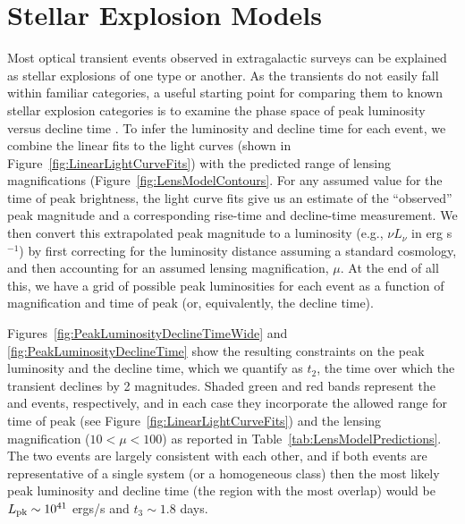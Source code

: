 \section{Stellar Explosion Models}
\label{sec:Classification}

Most optical transient events observed in extragalactic surveys can be
explained as stellar explosions of one type or another.  As the \spock
transients do not easily fall within familiar categories, a useful
starting point for comparing them to known stellar explosion
categories is to examine the phase space of peak luminosity versus
decline time \citep[see, e.g.,][]{Kasliwal:2010}.  To infer the
luminosity and decline time for each \spock event, we combine the
linear fits to the light curves (shown in
Figure~\ref{fig:LinearLightCurveFits}) with the predicted range of
lensing magnifications (Figure~\ref{fig:LensModelContours}. For any
assumed value for the time of peak brightness, the light curve fits
give us an estimate of the ``observed'' peak magnitude and a
corresponding rise-time and decline-time measurement.  We then convert
this extrapolated peak magnitude to a luminosity (e.g., $\nu L_\nu$ in
erg s$^{-1}$) by first correcting for the luminosity distance assuming
a standard \LCDM cosmology, and then accounting for an assumed lensing
magnification, $\mu$.  At the end of all this, we have a grid of
possible peak luminosities for each event as a function of
magnification and time of peak (or, equivalently, the decline time).

Figures~\ref{fig:PeakLuminosityDeclineTimeWide} and
\ref{fig:PeakLuminosityDeclineTime} show the resulting
constraints on the peak luminosity and the decline time, which we
quantify as $t_2$, the time over which the transient declines by 2
magnitudes.  Shaded green and red bands represent the \spockone and
\spocktwo events, respectively, and in each case they incorporate the
allowed range for time of peak (see
Figure~\ref{fig:LinearLightCurveFits}) and the lensing magnification
($10<\mu<100$) as reported in Table~\ref{tab:LensModelPredictions}.
The two events are largely consistent with each other, and if both
events are representative of a single system (or a homogeneous class)
then the most likely peak luminosity and decline time (the region with
the most overlap) would be $L_{\rm pk}\sim10^{41}$ ergs/s and
$t_3\sim1.8$ days.


